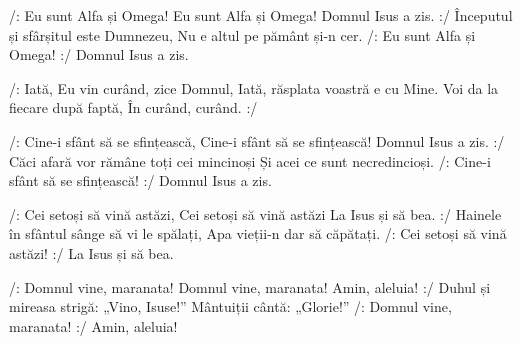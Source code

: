 \beginverse
/: Eu sunt Alfa și Omega!
Eu sunt Alfa și Omega!
Domnul Isus a zis. :/
Începutul și sfârșitul este Dumnezeu,
Nu e altul pe pământ și-n cer.
/: Eu sunt Alfa și Omega! :/
Domnul Isus a zis.
\endverse

\beginchorus
/: Iată, Eu vin curând, zice Domnul,
Iată, răsplata voastră e cu Mine.
Voi da la fiecare după faptă,
În curând, curând. :/
\endchorus

\beginverse
/: Cine-i sfânt să se sfințească,
Cine-i sfânt să se sfințească!
Domnul Isus a zis. :/
Căci afară vor rămâne toți cei mincinoși
Și acei ce sunt necredincioși.
/: Cine-i sfânt să se sfințească! :/
Domnul Isus a zis.
\endverse

\beginverse
/: Cei setoși să vină astăzi,
Cei setoși să vină astăzi
La Isus și să bea. :/
Hainele în sfântul sânge să vi le spălați,
Apa vieții-n dar să căpătați.
/: Cei setoși să vină astăzi! :/
La Isus și să bea.
\endverse

\beginverse
/: Domnul vine, maranata!
Domnul vine, maranata!
Amin, aleluia! :/
Duhul și mireasa strigă: „Vino, Isuse!”
Mântuiții cântă: „Glorie!”
/: Domnul vine, maranata! :/
Amin, aleluia!
\endverse
\endsong